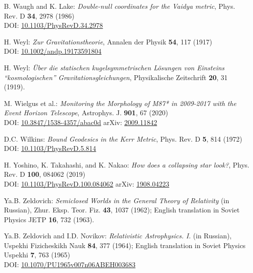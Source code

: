\begin{thebibliography}{123}
B. Waugh and K. Lake:
{\em Double-null coordinates for the Vaidya metric},
Phys. Rev. D {\bf 34}, 2978 (1986)\\
DOI: \href{https://doi.org/10.1103/PhysRevD.34.2978}{10.1103/PhysRevD.34.2978}

H. Weyl:
{\em Zur Gravitationstheorie},
Annalen der Physik {\bf 54}, 117 (1917)\\
DOI: \href{https://doi.org/10.1002/andp.19173591804}{10.1002/andp.19173591804}

H. Weyl:
{\em \"Uber die statischen kugelsymmetrischen L\"osungen von Einsteins ``kosmologischen'' Gravitationsgleichungen},
Physikalische Zeitschrift {\bf 20}, 31 (1919).

M. Wielgus et al.:
{\em Monitoring the Morphology of M87* in 2009-2017 with the Event Horizon Telescope},
Astrophys. J. {\bf 901}, 67 (2020)\\
DOI: \href{https://doi.org/10.3847/1538-4357/abac0d}{10.3847/1538-4357/abac0d}\hfill
arXiv: \href{https://arxiv.org/abs/2009.11842}{2009.11842}

D.C. Wilkins:
{\em Bound Geodesics in the Kerr Metric},
Phys. Rev. D {\bf 5}, 814 (1972)\\
DOI: \href{https://doi.org/10.1103/PhysRevD.5.814}{10.1103/PhysRevD.5.814}

H. Yoshino, K. Takahashi, and K. Nakao:
{\em How does a collapsing star look?},
Phys. Rev. D {\bf 100}, 084062 (2019)\\
DOI: \href{https://doi-org.ezproxy.obspm.fr/10.1103/PhysRevD.100.084062}{10.1103/PhysRevD.100.084062}\hfill
arXiv: \href{https://arxiv.org/abs/1908.04223}{1908.04223}


Ya.B. Zeldovich:
{\em Semiclosed Worlds in the General Theory of Relativity} (in Russian),
Zhur. Eksp. Teor. Fiz. {\bf 43}, 1037 (1962); English translation in
Soviet Physics JETP {\bf 16}, 732 (1963).

Ya.B. Zeldovich and I.D. Novikov:
{\em Relativistic Astrophysics. I.} (in Russian),
Uspekhi Fizicheskikh Nauk {\bf 84}, 377 (1964);
English translation in Soviet Physics Uspekhi {\bf 7}, 763 (1965)\\
DOI: \href{https://doi.org/10.1070/PU1965v007n06ABEH003683}{10.1070/PU1965v007n06ABEH003683}


\end{thebibliography}
